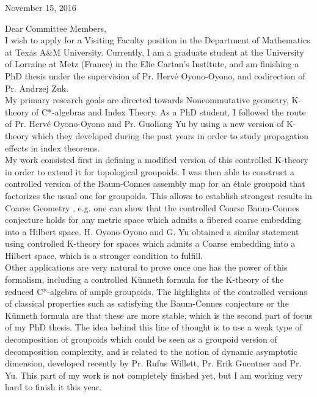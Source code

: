 November 15, 2016

Dear Committee Members,\\

I wish to apply for a Visiting Faculty position in the Department of Mathematics at Texas A$\&$M University. Currently, I am a graduate student at the University of Lorraine at Metz (France) in the Elie Cartan’s Institute, and am finishing a PhD thesis under the supervision of Pr. Hervé Oyono-Oyono, and codirection of Pr. Andrzej Zuk.\\

My primary research goals are directed towards Noncommutative geometry, K-theory of C*-algebras and Index Theory. As a PhD student, I followed the route of Pr. Hervé Oyono-Oyono and Pr. Guoliang Yu by using a new version of K-theory which they developed during the past years in order to study propagation effects in index theorems.\\

My work consisted first in defining a modified version of this controlled K-theory in order to extend it for topological groupoids. I was then able to construct a controlled version of the Baum-Connes assembly map for an étale groupoid that factorizes the usual one for groupoids. This allows to establish strongest results in Coarse Geometry , e.g. one can show that the controlled Coarse Baum-Connes conjecture holds for any metric space which admits a fibered coarse embedding into a Hilbert space. H. Oyono-Oyono and G. Yu obtained a similar statement using controlled K-theory for spaces which admits a Coarse embedding into a Hilbert space, which is a stronger condition to fulfill. \\

Other applications are very natural to prove once one has the power of this formalism, including a controlled Künneth formula for the K-theory of the reduced C*-algebra of ample groupoids. The highlights of the controlled versions of classical properties such as satisfying the Baum-Connes conjecture or the Künneth formula are that these are more stable, which is the second part of focus of my PhD thesis. The idea behind this line of thought is to use a weak type of decomposition of groupoids which could be seen as a groupoid version of decomposition complexity, and is related to the notion of dynamic asymptotic dimension, developed recently by Pr. Rufus Willett, Pr. Erik Guentner and Pr. Yu. This part of my work is not completely finished yet, but I am working very hard to finish it this year.\\

